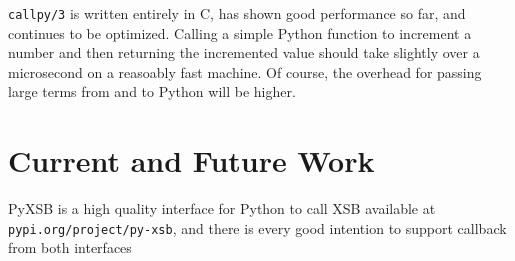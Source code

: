 {\tt callpy/3} is written entirely in C, has shown good performance so
far, and continues to be optimized.  Calling a simple Python function
to increment a number and then returning the incremented value should
take slightly over a microsecond on a reasoably fast machine.  Of
course, the overhead for passing large terms from and to Python will
be higher.

\section{Current and Future Work}

PyXSB is a high quality interface for Python to call XSB available at
{\tt pypi.org/project/py-xsb}, and there is every good intention to
support callback from both interfaces


